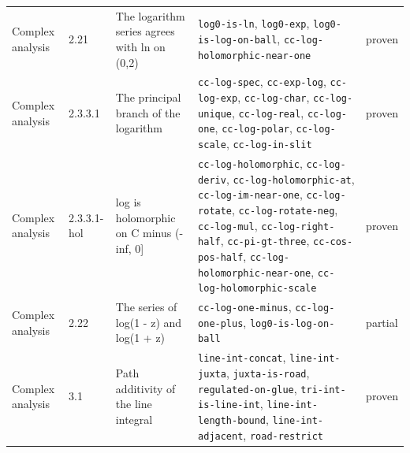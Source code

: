 \begin{longtable}{@{}ll>{\raggedright\arraybackslash}p{4.2cm}>{\raggedright\arraybackslash}p{4.2cm}l@{}}
Complex analysis & 2.21 & The logarithm series agrees with ln on (0,2) & \texttt{log0-\allowbreak{}is-\allowbreak{}ln}, \texttt{log0-\allowbreak{}exp}, \texttt{log0-\allowbreak{}is-\allowbreak{}log-\allowbreak{}on-\allowbreak{}ball}, \texttt{cc-\allowbreak{}log-\allowbreak{}holomorphic-\allowbreak{}near-\allowbreak{}one} & proven \\
Complex analysis & 2.3.3.1 & The principal branch of the logarithm & \texttt{cc-\allowbreak{}log-\allowbreak{}spec}, \texttt{cc-\allowbreak{}exp-\allowbreak{}log}, \texttt{cc-\allowbreak{}log-\allowbreak{}exp}, \texttt{cc-\allowbreak{}log-\allowbreak{}char}, \texttt{cc-\allowbreak{}log-\allowbreak{}unique}, \texttt{cc-\allowbreak{}log-\allowbreak{}real}, \texttt{cc-\allowbreak{}log-\allowbreak{}one}, \texttt{cc-\allowbreak{}log-\allowbreak{}polar}, \texttt{cc-\allowbreak{}log-\allowbreak{}scale}, \texttt{cc-\allowbreak{}log-\allowbreak{}in-\allowbreak{}slit} & proven \\
Complex analysis & 2.3.3.1-hol & log is holomorphic on C minus (-inf, 0] & \texttt{cc-\allowbreak{}log-\allowbreak{}holomorphic}, \texttt{cc-\allowbreak{}log-\allowbreak{}deriv}, \texttt{cc-\allowbreak{}log-\allowbreak{}holomorphic-\allowbreak{}at}, \texttt{cc-\allowbreak{}log-\allowbreak{}im-\allowbreak{}near-\allowbreak{}one}, \texttt{cc-\allowbreak{}log-\allowbreak{}rotate}, \texttt{cc-\allowbreak{}log-\allowbreak{}rotate-\allowbreak{}neg}, \texttt{cc-\allowbreak{}log-\allowbreak{}mul}, \texttt{cc-\allowbreak{}log-\allowbreak{}right-\allowbreak{}half}, \texttt{cc-\allowbreak{}pi-\allowbreak{}gt-\allowbreak{}three}, \texttt{cc-\allowbreak{}cos-\allowbreak{}pos-\allowbreak{}half}, \texttt{cc-\allowbreak{}log-\allowbreak{}holomorphic-\allowbreak{}near-\allowbreak{}one}, \texttt{cc-\allowbreak{}log-\allowbreak{}holomorphic-\allowbreak{}scale} & proven \\
Complex analysis & 2.22 & The series of log(1 - z) and log(1 + z) & \texttt{cc-\allowbreak{}log-\allowbreak{}one-\allowbreak{}minus}, \texttt{cc-\allowbreak{}log-\allowbreak{}one-\allowbreak{}plus}, \texttt{log0-\allowbreak{}is-\allowbreak{}log-\allowbreak{}on-\allowbreak{}ball} & partial \\
Complex analysis & 3.1 & Path additivity of the line integral & \texttt{line-\allowbreak{}int-\allowbreak{}concat}, \texttt{line-\allowbreak{}int-\allowbreak{}juxta}, \texttt{juxta-\allowbreak{}is-\allowbreak{}road}, \texttt{regulated-\allowbreak{}on-\allowbreak{}glue}, \texttt{tri-\allowbreak{}int-\allowbreak{}is-\allowbreak{}line-\allowbreak{}int}, \texttt{line-\allowbreak{}int-\allowbreak{}length-\allowbreak{}bound}, \texttt{line-\allowbreak{}int-\allowbreak{}adjacent}, \texttt{road-\allowbreak{}restrict} & proven \\

\end{longtable}
